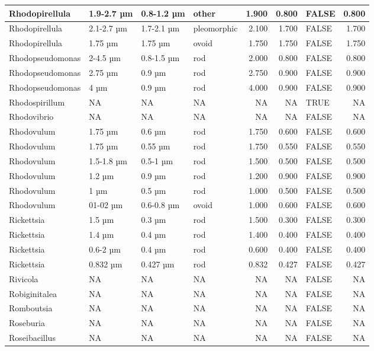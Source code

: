 \documentclass[
]{article}
\begin{document}
\begin{table}
\begin{tabular}{l|l|l|l|r|r|l|r}
\hline
Rhodopirellula & 1.9-2.7 µm & 0.8-1.2 µm & other & 1.900 & 0.800 & FALSE & 0.800\\
\hline
Rhodopirellula & 2.1-2.7 µm & 1.7-2.1 µm & pleomorphic & 2.100 & 1.700 & FALSE & 1.700\\
\hline
Rhodopirellula & 1.75 µm & 1.75 µm & ovoid & 1.750 & 1.750 & FALSE & 1.750\\
\hline
Rhodopseudomonas & 2-4.5 µm & 0.8-1.5 µm & rod & 2.000 & 0.800 & FALSE & 0.800\\
\hline
Rhodopseudomonas & 2.75 µm & 0.9 µm & rod & 2.750 & 0.900 & FALSE & 0.900\\
\hline
Rhodopseudomonas & 4 µm & 0.9 µm & rod & 4.000 & 0.900 & FALSE & 0.900\\
\hline
Rhodospirillum & NA & NA & NA & NA & NA & TRUE & NA\\
\hline
Rhodovibrio & NA & NA & NA & NA & NA & FALSE & NA\\
\hline
Rhodovulum & 1.75 µm & 0.6 µm & rod & 1.750 & 0.600 & FALSE & 0.600\\
\hline
Rhodovulum & 1.75 µm & 0.55 µm & rod & 1.750 & 0.550 & FALSE & 0.550\\
\hline
Rhodovulum & 1.5-1.8 µm & 0.5-1 µm & rod & 1.500 & 0.500 & FALSE & 0.500\\
\hline
Rhodovulum & 1.2 µm & 0.9 µm & rod & 1.200 & 0.900 & FALSE & 0.900\\
\hline
Rhodovulum & 1 µm & 0.5 µm & rod & 1.000 & 0.500 & FALSE & 0.500\\
\hline
Rhodovulum & 01-02 µm & 0.6-0.8 µm & ovoid & 1.000 & 0.600 & FALSE & 0.600\\
\hline
Rickettsia & 1.5 µm & 0.3 µm & rod & 1.500 & 0.300 & FALSE & 0.300\\
\hline
Rickettsia & 1.4 µm & 0.4 µm & rod & 1.400 & 0.400 & FALSE & 0.400\\
\hline
Rickettsia & 0.6-2 µm & 0.4 µm & rod & 0.600 & 0.400 & FALSE & 0.400\\
\hline
Rickettsia & 0.832 µm & 0.427 µm & rod & 0.832 & 0.427 & FALSE & 0.427\\
\hline
Rivicola & NA & NA & NA & NA & NA & FALSE & NA\\
\hline
Robiginitalea & NA & NA & NA & NA & NA & FALSE & NA\\
\hline
Romboutsia & NA & NA & NA & NA & NA & FALSE & NA\\
\hline
Roseburia & NA & NA & NA & NA & NA & FALSE & NA\\
\hline
Roseibacillus & NA & NA & NA & NA & NA & FALSE & NA\\

\end{tabular}
\end{table}
\end{document}
